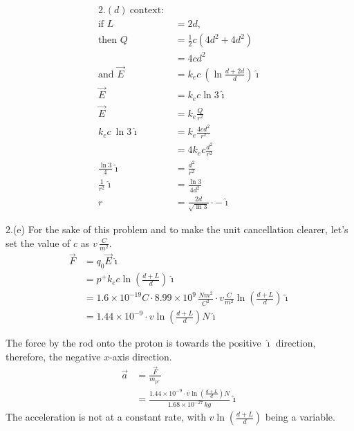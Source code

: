 \documentclass[11pt]{article}
\begin{document}
\newpage
\begin{align*}
2.(d)\ \text{context: } \\
\text{if } L &= 2d \text{,} \\
\text{then } Q &= \frac{1}{2}c(4d^2+4d^2) \\
              &= 4 cd^2 \\
\text{and } \overrightarrow{E} &= k_e c \ (\ln \frac{d+2d}{d}) \hat{\imath} \\
\overrightarrow{E} &= k_e c \ln 3 \hat{\imath} \\
\overrightarrow{E} &= k_{e} \frac{Q}{r^{2}} \\
k_{e}c \ \ln3 \hat{\imath} &= k_{e} \frac{4cd^{2}}{r^{2}} \\
                           &= 4k_{e}c \frac{d^{2}}{r^{2}} \\
\tfrac{\ln 3}{4} \hat{\imath} &= \tfrac{d^{2}}{r^{2}} \\
\tfrac{1}{r^{2}} \hat{\imath} &= \tfrac{\ln 3}{4d^{2}} \\
                            r &= \tfrac{2d}{ \sqrt{\ln 3} } \cdot -\hat{\imath}
\end{align*}

2.(e)
For the sake of this problem and to make the unit cancellation clearer, let’s set the value of \(c\) as \(v \,\frac{C}{m^2}\).
\begin{align*}
\overrightarrow{F} &= q_{0} \overrightarrow{E} \hat{\imath} \\
                   &= p^{+} k_{e}c \ln\!\left(\frac{d+L}{d}\right) \hat{\imath} \\
                   &= 1.6 \times 10^{-19}C \cdot 8.99 \times 10^{9} 
                      \,\frac{N m^2}{C^2} \cdot v \frac{C}{m^2}
                      \ln\!\left(\frac{d+L}{d}\right)\hat{\imath} \\
                   &= 1.44 \times 10^{-9} \cdot v \ln\!\left(\frac{d+L}{d}\right) N \hat{\imath}
\end{align*}

The force by the rod onto the proton is towards the positive \(\hat{\imath}\) direction, therefore, the negative \(x\)-axis direction.
\begin{align*}
\overrightarrow{a} &= \frac{ \overrightarrow{F} }{m_{p^{+}}} \\
&= \frac{ 1.44 \times 10^{-9} \cdot v \ln\!\left(\frac{d+L}{d}\right) N }{ 1.68 \times 10^{-27} \, kg} \hat{\imath}
\end{align*}
The acceleration is not at a constant rate, with \(v \ln\!\left(\frac{d+L}{d}\right)\) being a variable.
\end{document}
